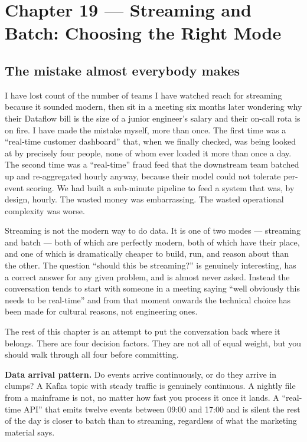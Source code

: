 \documentclass[
  11pt,
  british,
  oneside]{book}
\begin{document}
\hypertarget{chapter-19-streaming-and-batch-choosing-the-right-mode}{%
\chapter{Chapter 19 --- Streaming and Batch: Choosing the Right
Mode}\label{chapter-19-streaming-and-batch-choosing-the-right-mode}}

\hypertarget{the-mistake-almost-everybody-makes}{%
\section{The mistake almost everybody
makes}\label{the-mistake-almost-everybody-makes}}

I have lost count of the number of teams I have watched reach for
streaming because it sounded modern, then sit in a meeting six months
later wondering why their Dataflow bill is the size of a junior
engineer's salary and their on-call rota is on fire. I have made the
mistake myself, more than once. The first time was a ``real-time
customer dashboard'' that, when we finally checked, was being looked at
by precisely four people, none of whom ever loaded it more than once a
day. The second time was a ``real-time'' fraud feed that the downstream
team batched up and re-aggregated hourly anyway, because their model
could not tolerate per-event scoring. We had built a sub-minute pipeline
to feed a system that was, by design, hourly. The wasted money was
embarrassing. The wasted operational complexity was worse.

Streaming is not the modern way to do data. It is one
of two modes --- streaming and batch --- both of which are
perfectly modern, both of which have their place, and one of which is
dramatically cheaper to build, run, and reason about than the other. The
question ``should this be streaming?'' is genuinely interesting, has a
correct answer for any given problem, and is almost never asked. Instead
the conversation tends to start with someone in a meeting saying ``well
obviously this needs to be real-time'' and from that moment onwards the
technical choice has been made for cultural reasons, not engineering
ones.

The rest of this chapter is an attempt to put the conversation back
where it belongs. There are four decision factors. They are not all of
equal weight, but you should walk through all four before committing.

\textbf{Data arrival pattern.} Do events arrive continuously, or do they
arrive in clumps? A Kafka topic with steady traffic is genuinely
continuous. A nightly file from a mainframe is not, no matter how fast
you process it once it lands. A ``real-time API'' that emits twelve
events between 09:00 and 17:00 and is silent the rest of the day is
closer to batch than to streaming, regardless of what the marketing
material says.
\end{document}
